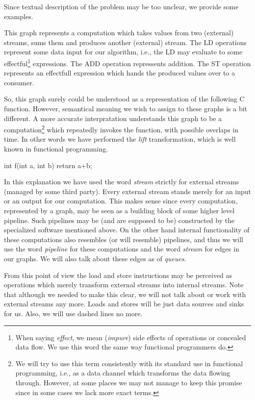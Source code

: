 Since textual description of the problem may be too unclear, we provide some examples.


This graph represents a computation which takes values from two (external) streams, sums them and produces another (external) stream. The LD operations represent some data input for our algorithm, i.e., the LD may evaluate to some effectful\footnote{When saying \emph{effect}, we mean (\emph{impure}) side effects of operations or concealed data flow. We use this word the same way functional programmers do.} expressions. The ADD operation repressents addition. The ST operation represents an effectfull expression which hands the produced values over to a consumer. 


So, this graph surely could be understood as a representation of the following C function. However, semantical meaning we wish to assign to these graphs is a bit different. A more accurate interpratation understands this graph to be a computation\footnote{We will try to use this term consistently with its standard use in functional programming, i.e., as a data channel which transforms the data flowing through. However, at some places we may not manage to keep this promise since in some cases we lack more exact terms.} which repeatedly invokes the function, with possible overlaps in time. In other words we have performed the \emph{lift} transformation, which is well known in functional programming.


\begin{code}
int f(int a, int b)
{
  return a+b;
}
\end{code}

In this explanation we have used the word \emph{stream} strictly for external streams (managed by some third party). Every external stream stands merely for an input or an output for our computation. This makes sense since every computation, represented by a graph, may be seen as a building block of some higher level pipeline. Such pipelines may be (and are supposed to be) constructed by the specialized software mentioned above. On the other hand internal functionality of these computations also resembles (or will resemble) pipelines, and thus we will use the word \emph{pipeline} for these computations and the word \emph{stream} for edges in our graphs. We will also talk about these edges as of \emph{queues}. 


From this point of view the load and store instructions may be perceived as operations which merely transform external streams into internal streams. Note that although we needed to make this clear, we will not talk about or work with external streams any more. Loads and stores will be just data sources and sinks for us. Also, we will use dashed lines no more.


